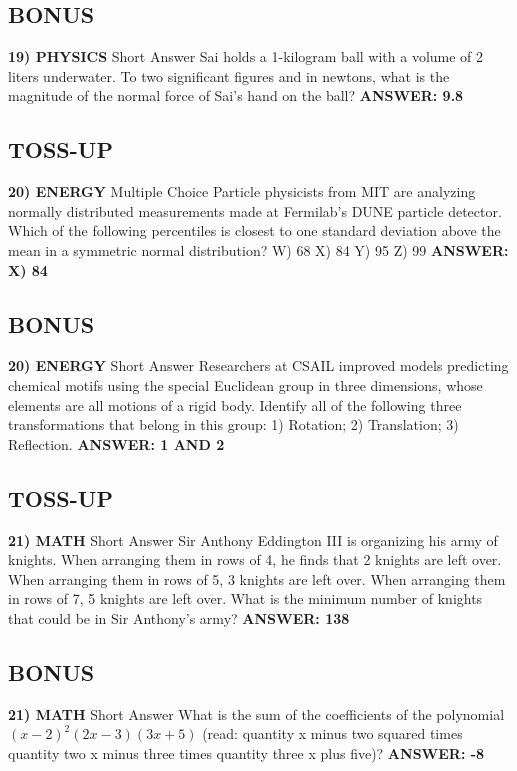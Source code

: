 \documentclass{article}
\begin{document}
\subsection*{BONUS}
\textbf{19) PHYSICS}
Short Answer Sai holds a 1-kilogram ball with a volume of 2 liters underwater.
To two significant figures and in newtons, what is the magnitude of the normal force of Sai's hand on the ball?
\textbf{ANSWER: 9.8}

\newpage

\subsection*{TOSS-UP}
\textbf{20) ENERGY}
Multiple Choice Particle physicists from MIT are analyzing normally distributed measurements made at Fermilab's DUNE particle detector.
Which of the following percentiles is closest to one standard deviation above the mean in a symmetric normal distribution?
W) 68
X) 84
Y) 95
Z) 99
\textbf{ANSWER: X) 84}

\subsection*{BONUS}
\textbf{20) ENERGY}
Short Answer Researchers at CSAIL improved models predicting chemical motifs using the special Euclidean group in three dimensions, whose elements are all motions of a rigid body.
Identify all of the following three transformations that belong in this group: 1) Rotation; 2) Translation; 3) Reflection.
\textbf{ANSWER: 1 AND 2}

\subsection*{TOSS-UP}
\textbf{21) MATH}
Short Answer Sir Anthony Eddington III is organizing his army of knights.
When arranging them in rows of 4, he finds that 2 knights are left over.
When arranging them in rows of 5, 3 knights are left over.
When arranging them in rows of 7, 5 knights are left over.
What is the minimum number of knights that could be in Sir Anthony's army?
\textbf{ANSWER: 138}

\subsection*{BONUS}
\textbf{21) MATH}
Short Answer What is the sum of the coefficients of the polynomial $(x-2)^{2}(2x-3)(3x+5)$ (read: quantity x minus two squared times quantity two x minus three times quantity three x plus five)?
\textbf{ANSWER: -8}
\end{document}
